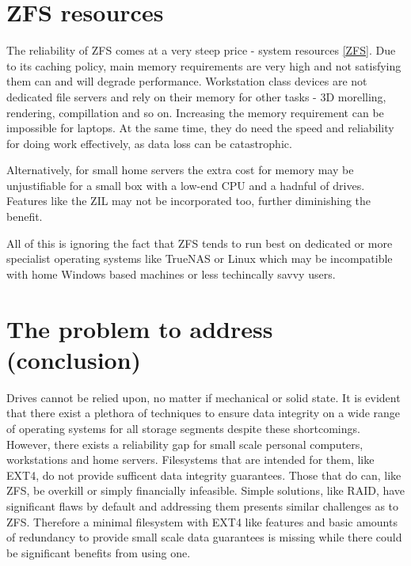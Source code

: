     \section{ZFS resources}

        The reliability of ZFS comes at a very steep price - system resources
        \ref{ZFS}. Due to its caching policy, main memory requirements are very
        high and not satisfying them can and will degrade performance.
        Workstation class devices are not dedicated file servers and rely on
        their memory for other tasks - 3D morelling, rendering, compillation
        and so on. Increasing the memory requirement can be impossible for
        laptops. At the same time, they do need the speed and reliability for
        doing work effectively, as data loss can be catastrophic.

        Alternatively, for small home servers the extra cost for memory may be
        unjustifiable for a small box with a low-end CPU and a hadnful of
        drives. Features like the ZIL may not be incorporated too, further
        diminishing the benefit.

        All of this is ignoring the fact that ZFS tends to run best on
        dedicated or more specialist operating systems like TrueNAS or Linux
        which may be incompatible with home Windows based machines or less
        techincally savvy users.

    \section{The problem to address (conclusion)}

        Drives cannot be relied upon, no matter if mechanical or solid state.
        It is evident that there exist a plethora of techniques to ensure data
        integrity on a wide range of operating systems for all storage segments
        despite these shortcomings. However, there exists a reliability gap for
        small scale personal computers, workstations and home servers.
        Filesystems that are intended for them, like EXT4, do not provide
        sufficent data integrity guarantees. Those that do can, like ZFS, be
        overkill or simply financially infeasible. Simple solutions, like RAID,
        have significant flaws by default and addressing them presents similar
        challenges as to ZFS. Therefore a minimal filesystem with EXT4 like
        features and basic amounts of redundancy to provide small scale data
        guarantees is missing while there could be significant benefits from
        using one.
